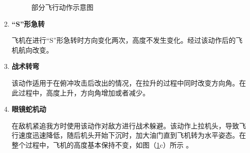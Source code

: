 \documentclass{my_paper}
\begin{document}
\begin{enumerate}
\begin{figure}[htbp]
        \caption{部分飞行动作示意图}    %
        \label{dz}    %
    \end{figure}
    
    \item \textbf{“S”形急转}
    
    飞机在进行“S”形急转时方向变化两次，高度不发生变化。经过该动作后的飞机航向改变。

    \item \textbf{战术转弯}
    
    该动作适用于在俯冲攻击后改出的情况，在拉升的过程中同时改变方向角。在此过程中，高度上升，方向角增加或者减少。

    \item \textbf{眼镜蛇机动}
    
    在敌机紧追我方时使用该动作对敌方进行战术躲避。\cite{7}该动作上拉机头，导致飞行速度迅速降低，随后机头开始下沉时，加大油门直到飞机转为水平姿态。在整个过程中，飞机的高度基本保持不变，如图（\ref{dz}c）所示 。
    
\end{enumerate}
\end{document}
